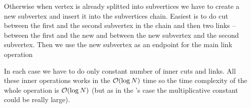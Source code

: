 Otherwise when vertex is already splitted into subvertices we have to create
a new subvertex and insert it into the subvertices chain. Easiest is to do cut
between the first and the second subvertex in the chain and then two links --
between the first and the new and between the new subvertex and the second subvertex.
Then we use the new subvertex as an endpoint for the main link operation

In each case we have to do only constant number of inner cuts and links. All
these inner operations works in the ${\cal O}(\log N)$ time so the time complexity of
the whole \Link{} operation is ${\cal O}(\log N)$ (but as in the \Cut's case the
multiplicative constant could be really large).
